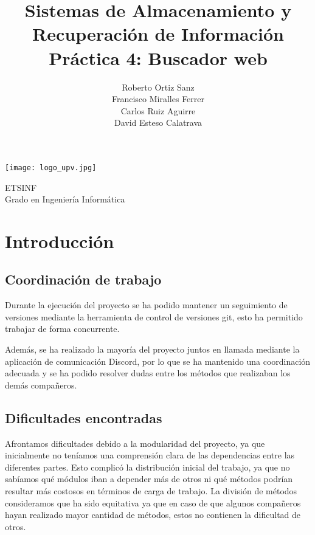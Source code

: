 \documentclass[12pt,a4paper]{article}
\title{\textbf{Sistemas de Almacenamiento y\\ Recuperación de Información\\Práctica 4: Buscador web}}
\author{
  Roberto Ortiz Sanz \\ 
  Francisco Miralles Ferrer \\ 
  Carlos Ruiz Aguirre \\ 
  David Esteso Calatrava
}
\begin{document}
\begin{titlepage}
\maketitle
\begin{center}

\vspace{10mm}

\texttt{[image: logo\_upv.jpg]}

\vfill

\large
ETSINF\\
Grado en Ingeniería Informática
\end{center}
\end{titlepage}

\tableofcontents

\newpage

\section{Introducción}

\subsection{Coordinación de trabajo}
Durante la ejecución del proyecto se ha podido mantener un seguimiento de versiones mediante la herramienta de control de versiones git, esto ha permitido trabajar de forma concurrente.

Además, se ha realizado la mayoría del proyecto juntos en llamada mediante la aplicación de comunicación Discord, por lo que se ha mantenido una coordinación adecuada y se ha podido resolver dudas entre los métodos que realizaban los demás compañeros.

\subsection{Dificultades encontradas}
Afrontamos dificultades debido a la modularidad del proyecto, ya que inicialmente no teníamos una comprensión clara de las dependencias entre las diferentes partes. Esto complicó la distribución inicial del trabajo, ya que no sabíamos qué módulos iban a depender más de otros ni qué métodos podrían resultar más costosos en términos de carga de trabajo. La división de métodos consideramos que ha sido equitativa ya que en caso de que algunos compañeros hayan realizado mayor cantidad de métodos, estos no contienen la dificultad de otros.
\end{document}
